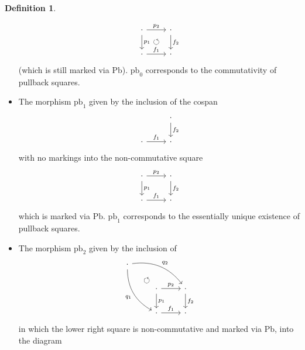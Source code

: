 \documentclass[a4paper]{article}
\theoremstyle{remark}
\theoremstyle{definition}
\newtheorem{definition}[theorem]{Definition}
\begin{document}
\begin{definition}
\begin{itemize}
      \begin{equation}
        \begin{tikzcd}
          \cdot \arrow[dr, phantom, "\circlearrowleft"] \arrow[r, "p_2"] \arrow[d, "p_1"] & \cdot \arrow[d, "f_2"] \\
          \cdot \arrow[r, "f_1"] & \cdot
        \end{tikzcd}
      \end{equation}
      (which is still marked via $\mathrm{Pb}$).
      $\mathrm{pb}_0$ corresponds to the commutativity of pullback squares.
    \item
      \label{itm:pbs-exist}
      The morphism $\mathrm{pb}_1$ given by the inclusion of the cospan
      \begin{equation}
        \begin{tikzcd}
            & \cdot \arrow[d, "f_2"] \\
            \cdot \arrow[r, "f_1"] & \cdot 
        \end{tikzcd}
      \end{equation}
      with no markings into the non-commutative square
      \begin{equation}
        \begin{tikzcd}
          \cdot \arrow[r, "p_2"] \arrow[d, "p_1"] & \cdot \arrow[d, "f_2"] \\
          \cdot \arrow[r, "f_1"] & \cdot
        \end{tikzcd}
      \end{equation}
      which is marked via $\mathrm{Pb}$.
      $\mathrm{pb}_1$ corresponds to the essentially unique existence of pullback squares.
    \item
      \label{itm:pbs-factorizations}
      The morphism $\mathrm{pb}_2$ given by the inclusion of
      \begin{equation}
        \begin{tikzcd}
          \cdot \arrow[ddr, bend right, "q_1"'] \arrow[drr, bend left, "q_2"] \arrow[dr, phantom, "\circlearrowleft", near end] \\
          & \cdot \arrow[d, "p_1"] \arrow[r, "p_2"] & \cdot \arrow[d, "f_2"] \\
          & \cdot \arrow[r, "f_1"] & \cdot
        \end{tikzcd}
      \end{equation}
      in which the lower right square is non-commutative and marked via $\mathrm{Pb}$, into the diagram
      \begin{equation}
        \begin{tikzcd}

\end{tikzcd}
\end{equation}
\end{itemize}
\end{definition}
\end{document}
